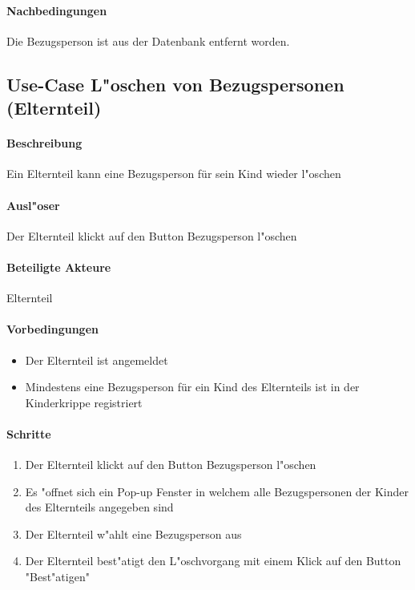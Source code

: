 		\paragraph{Nachbedingungen}
		Die Bezugsperson ist aus der Datenbank entfernt worden. 
		
		
		
		
		\newpage
		\subsection{Use-Case L"oschen von Bezugspersonen (Elternteil)}
		\paragraph{Beschreibung}
		Ein Elternteil kann eine Bezugsperson für sein Kind wieder l"oschen
		\paragraph{Ausl"oser}
		Der Elternteil klickt auf den Button \dq Bezugsperson l"oschen\dq
		\paragraph{Beteiligte Akteure}   \leavevmode \newline
		Elternteil
		\paragraph{Vorbedingungen}
		\begin{itemize}
			\item Der Elternteil ist angemeldet
			\item Mindestens eine Bezugsperson für ein Kind des Elternteils ist in der Kinderkrippe registriert
		\end{itemize}
		
		\paragraph{Schritte}
		\begin{enumerate}
			\item Der Elternteil klickt auf den Button \dq Bezugsperson l"oschen\dq
			\item Es "offnet sich ein Pop-up Fenster in welchem alle Bezugspersonen der Kinder des Elternteils angegeben sind
			\item Der Elternteil w"ahlt eine Bezugsperson aus
			\item Der Elternteil best"atigt den L"oschvorgang mit einem Klick auf den Button "Best"atigen"
		\end{enumerate}
		
